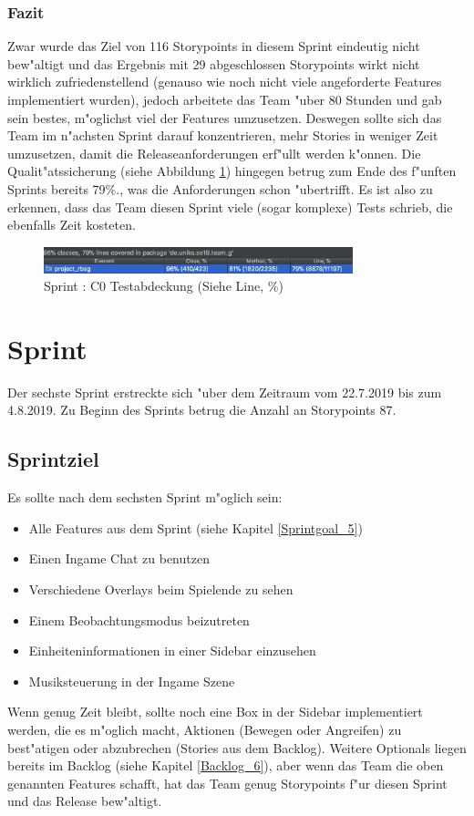 \documentclass[12pt, titlepage]{scrartcl}
\newcommand{\RN}[1]{%
	\textup{\uppercase\expandafter{\romannumeral#1}}%
}
\begin{document}
        	\subsubsection{Fazit}
        		Zwar wurde das Ziel von 116 Storypoints in diesem Sprint eindeutig nicht bew"altigt und das Ergebnis mit 29 abgeschlossen Storypoints wirkt nicht wirklich zufriedenstellend (genauso wie noch nicht viele angeforderte Features implementiert wurden), jedoch arbeitete das Team "uber 80 Stunden und gab sein bestes, m"oglichst viel der Features umzusetzen. Deswegen sollte sich das Team im n"achsten Sprint darauf konzentrieren, mehr Stories in weniger Zeit umzusetzen, damit die Releaseanforderungen erf"ullt werden k"onnen. Die Qualit"atssicherung (siehe Abbildung \ref{Coverage_5}) hingegen betrug zum Ende des f"unften Sprints bereits 79\%., was die Anforderungen schon "ubertrifft. Es ist also zu erkennen, dass das Team diesen Sprint viele (sogar komplexe) Tests schrieb, die ebenfalls Zeit kosteten.
        		\begin{figure}[H] 
        			\centering
        			\includegraphics[width=0.8\textwidth]{images/sprintV/coverage.png}
        			\caption{Sprint \RN{5}: C0 Testabdeckung (Siehe Line, \%)}
        			\label{Coverage_5}
        		\end{figure} 
    \newpage
    \section{Sprint \RN{6}}
    	Der sechste Sprint erstreckte sich "uber dem Zeitraum vom 22.7.2019 bis zum 4.8.2019. Zu Beginn des Sprints betrug die Anzahl an Storypoints 87.
    	\subsection{Sprintziel}
    		Es sollte nach dem sechsten Sprint m"oglich sein:
    		\begin{itemize}
    			\item Alle Features aus dem Sprint \RN{5} (siehe Kapitel \ref{Sprintgoal_5})
    			\item Einen Ingame Chat zu benutzen
    			\item Verschiedene Overlays beim Spielende zu sehen
    			\item Einem Beobachtungsmodus beizutreten
    			\item Einheiteninformationen in einer Sidebar einzusehen
    			\item Musiksteuerung in der Ingame Szene
    		\end{itemize}
    		Wenn genug Zeit bleibt, sollte noch eine Box in der Sidebar implementiert werden, die es m"oglich macht, Aktionen (Bewegen oder Angreifen) zu best"atigen oder abzubrechen (Stories aus dem Backlog). Weitere Optionals liegen bereits im Backlog (siehe Kapitel \ref{Backlog_6}), aber wenn das Team die oben genannten Features schafft, hat das Team genug Storypoints f"ur diesen Sprint und das Release bew"altigt.
\end{document}
